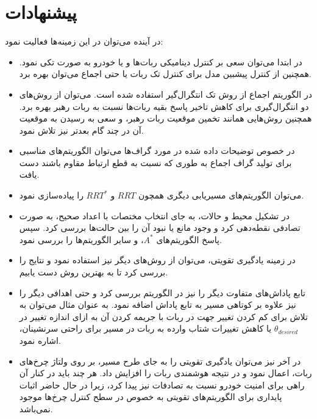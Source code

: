 \section{پیشنهادات}
در آینده می‌توان در این زمینه‌ها فعالیت نمود:
\begin{itemize}
	\item 
	در ابتدا می‌توان سعی بر کنترل دینامیکی ربات‌ها و یا خودرو به صورت تکی نمود. همچنین از کنترل پیشبین مدل برای کنترل تک ربات یا حتی اجماع می‌توان بهره برد.
	\item 
	در الگوریتم اجماع از روش تک انتگرال‌گیر استفاده شده است. می‌توان از روش‌های دو انتگرال‌گیری برای کاهش تاخیر پاسخ بقیه ربات‌ها نسبت به ربات رهبر بهره برد. همچنین روش‌هایی همانند تخمین موقعیت ربات رهبر، و سعی به رسیدن به موقعیت آن در چند گام بعدتر نیز تلاش نمود.
	
	\item 
	در خصوص توضیحات داده شده در مورد گراف‌ها می‌توان الگوریتم‌های مناسبی برای تولید گراف اجماع به طوری که نسبت به قطع ارتباط مقاوم باشند دست یافت.
	\item 
	می‌توان الگوریتم‌های مسیریابی دیگری همچون $RRT$ و $RRT^*$ را پیاده‌سازی نمود.
	\item 
	در تشکیل محیط و حالات، به جای انتخاب مختصات با اعداد صحیح، به صورت تصادفی نقطه‌دهی کرد و وجود مانع یا نبود آن را بین حالت‌ها بررسی کرد. سپس پاسخ الگوریتم‌های $A^*$،  و سایر الگوریتم‌ها را بررسی نمود.
	\item 
	در زمینه یادگیری تقویتی، می‌توان از روش‌های دیگر نیز استفاده نمود و نتایج را بررسی کرد تا به بهترین روش دست یابیم.
	\item 
	تابع پاداش‌های متفاوت دیگر را نیز در الگوریتم  بررسی کرد و حتی اهدافی دیگر را نیز علاوه بر کوتاهی مسیر به تابع پاداش اضافه نمود. به عنوان مثال می‌توان به تلاش برای کم کردن تغییر جهت در ربات با جریمه کردن آن به ازای اندازه تغییر در $\theta_{desired}$ یا کاهش تغییرات شتاب وارده به ربات در مسیر برای راحتی سرنشینان، اشاره نمود.
	\item 
	در آخر نیز می‌توان یادگیری تقویتی را به جای طرح مسیر، بر روی ولتاژ چرخ‌های ربات، اعمال نمود و در نتیجه هوشمندی ربات را افزایش داد. هر چند باید در کنار آن راهی برای امنیت خودرو نسبت به تصادفات نیز پیدا کرد، زیرا در حال حاضر اثبات پایداری برای الگوریتم‌های تقویتی به خصوص در سطح کنترل چرخ‌ها موجود نمی‌باشد.
	
	
	
	
	
	
	
	
	
	
	
	
\end{itemize}